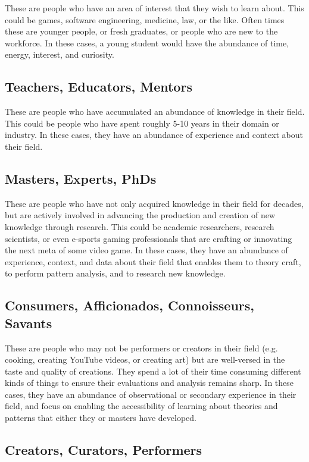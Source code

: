 \documentclass[journal, onecolumn]{IEEEtran}
\begin{document}
These are people who have an area of interest that they wish to learn
about. This could be games, software engineering, medicine, law, or the like.
Often times these are younger people, or fresh graduates, or people who are
new to the workforce. In these cases, a young student would have the abundance of 
time, energy, interest, and curiosity.

\subsection{Teachers, Educators, Mentors}

These are people who have accumulated an abundance of knowledge in their field.
This could be people who have spent roughly 5-10 years in their domain or industry.
In these cases, they have an abundance of experience and context about their
field.

\subsection{Masters, Experts, PhDs}

These are people who have not only acquired knowledge in their field for decades,
but are actively involved in advancing the production and creation of new 
knowledge through research. This could be academic researchers, research scientists,
or even e-sports gaming professionals that are crafting or innovating the next meta of 
some video game. In these cases, they have an abundance of experience, context, and
data about their field that enables them to theory craft, to perform pattern analysis,
and to research new knowledge.

\subsection{Consumers, Afficionados, Connoisseurs, Savants}

These are people who may not be performers or creators in their field (e.g. cooking,
creating YouTube videos, or creating art) but are well-versed in the taste and 
quality of creations. They spend a lot of their time consuming different kinds of
things to ensure their evaluations and analysis remains sharp. In these cases, 
they have an abundance of observational or secondary experience in their field,
and focus on enabling the accessibility of learning about theories and patterns 
that either they or masters have developed.

\subsection{Creators, Curators, Performers}
\end{document}
